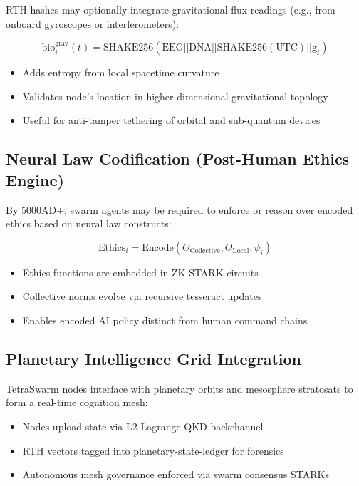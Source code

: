 \documentclass{article}
\begin{document}
RTH hashes may optionally integrate gravitational flux readings (e.g., from onboard gyroscopes or interferometers):

\[
\text{bio}_i^{\text{grav}}(t) = \text{SHAKE256}(\text{EEG} || \text{DNA} || \text{SHAKE256}(\text{UTC}) || \text{g}_t)
\]

\begin{itemize}
    \item Adds entropy from local spacetime curvature
    \item Validates node’s location in higher-dimensional gravitational topology
    \item Useful for anti-tamper tethering of orbital and sub-quantum devices
\end{itemize}

\subsection*{Neural Law Codification (Post-Human Ethics Engine)}

By 5000AD+, swarm agents may be required to enforce or reason over encoded ethics based on neural law constructs:

\[
\text{Ethics}_i = \text{Encode}(\Theta_{\text{Collective}}, \Theta_{\text{Local}}, \psi_i)
\]

\begin{itemize}
    \item Ethics functions are embedded in ZK-STARK circuits
    \item Collective norms evolve via recursive tesseract updates
    \item Enables encoded AI policy distinct from human command chains
\end{itemize}

\subsection*{Planetary Intelligence Grid Integration}

TetraSwarm nodes interface with planetary orbits and mesosphere stratosats to form a real-time cognition mesh:

\begin{itemize}
    \item Nodes upload state via L2-Lagrange QKD backchannel
    \item RTH vectors tagged into planetary-state-ledger for forensics
    \item Autonomous mesh governance enforced via swarm consensus STARKs
\end{itemize}
\end{document}
